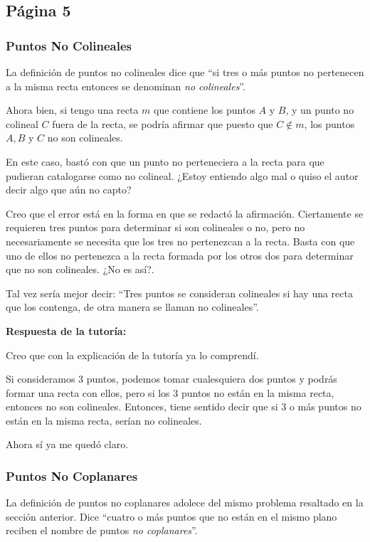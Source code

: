 \subsection{Página 5}

\subsubsection{Puntos No Colineales}

La definición de puntos no colineales dice que ``si tres o más puntos no pertenecen a la misma recta entonces se denominan \textit{no colineales}''.

Ahora bien, si tengo una recta \(m\) que contiene los puntos \(A\) y \(B\), y un punto no colineal \(C\) fuera de la recta, se podría afirmar que puesto que \(C \notin m\), los puntos \(A,B\) y \(C\) no son colineales.

En este caso, bastó con que un punto  no perteneciera a la recta para que pudieran catalogarse como no colineal. ¿Estoy entiendo algo mal o quiso el autor decir algo que aún no capto?

Creo que el error está en la forma en que se redactó la afirmación. Ciertamente se requieren tres puntos para determinar si son colineales o no, pero no necesariamente se necesita que los tres no pertenezcan a la recta. Basta con que uno de ellos no pertenezca a la recta formada por los otros dos para determinar que no son colineales. ¿No es así?.

Tal vez sería mejor decir: ``Tres puntos se consideran colineales si hay una recta que los contenga, de otra manera se llaman no colineales''.

\textbf{Respuesta de la tutoría:}

Creo que con la explicación de la tutoría ya lo comprendí.

Si consideramos 3 puntos, podemos tomar cualesquiera dos puntos y podrás formar una recta con ellos, pero si los 3 puntos no están en la misma recta, entonces no son colineales. Entonces, tiene sentido decir que si 3 o más puntos no están en la misma recta, serían no colineales.

Ahora sí ya me quedó claro.

\subsubsection{Puntos No Coplanares}

La definición de puntos no coplanares adolece del mismo problema resaltado en la sección anterior. Dice ``cuatro o más puntos que no están en el mismo plano reciben el nombre de puntos \textit{no coplanares}''.

